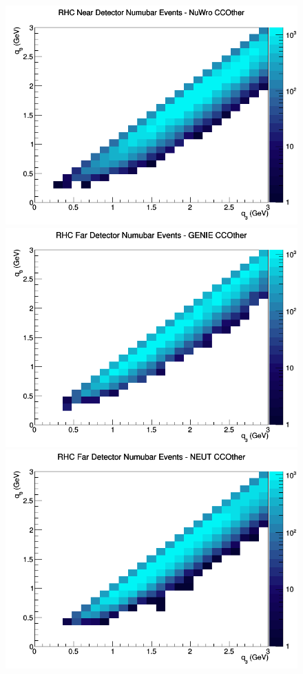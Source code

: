 \begin{figure}[h]
\includegraphics[width=\linewidth]{q0_q3/nominal/CCOther_RHC_ND_numubar_q3_q0_NuWro.png}
\endminipage
\newline
{}
\includegraphics[width=\linewidth]{q0_q3/nominal/CCOther_RHC_FD_numubar_q3_q0_GENIE.png}
\endminipage
{}
\includegraphics[width=\linewidth]{q0_q3/nominal/CCOther_RHC_FD_numubar_q3_q0_NEUT.png}

\end{figure}

